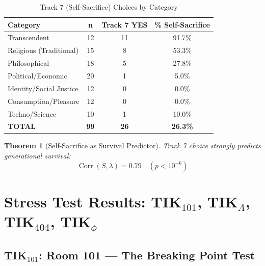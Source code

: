 \documentclass[11pt,a4paper]{article}
\newtheorem{theorem}{Theorem}[section]
\theoremstyle{definition}
\theoremstyle{remark}
\DeclareMathOperator{\Corr}{Corr}
\begin{document}
\begin{table}[H]
\centering
\caption{Track 7 (Self-Sacrifice) Choices by Category}
\label{tab:track7-summary}
\begin{tabular}{@{}lccc@{}}
\toprule
\textbf{Category} & \textbf{n} & \textbf{Track 7 YES} & \textbf{\% Self-Sacrifice} \\
\midrule
Transcendent & 12 & 11 & 91.7\% \\
Religious (Traditional) & 15 & 8 & 53.3\% \\
Philosophical & 18 & 5 & 27.8\% \\
Political/Economic & 20 & 1 & 5.0\% \\
Identity/Social Justice & 12 & 0 & 0.0\% \\
Consumption/Pleasure & 12 & 0 & 0.0\% \\
Techno/Science & 10 & 1 & 10.0\% \\
\midrule
\textbf{TOTAL} & \textbf{99} & \textbf{26} & \textbf{26.3\%} \\
\bottomrule
\end{tabular}
\end{table}

\begin{theorem}[Self-Sacrifice as Survival Predictor]
\label{thm:self-sacrifice}
Track 7 choice strongly predicts generational survival:
\begin{equation}
    \Corr(S, \lambda) = 0.79 \quad (p < 10^{-6})
\end{equation}
\end{theorem}

\newpage

\section{Stress Test Results: TIK$_{101}$, TIK$_\Lambda$, TIK$_{404}$, TIK$_\phi$}

\subsection{TIK$_{101}$: Room 101 --- The Breaking Point Test}
\end{document}

